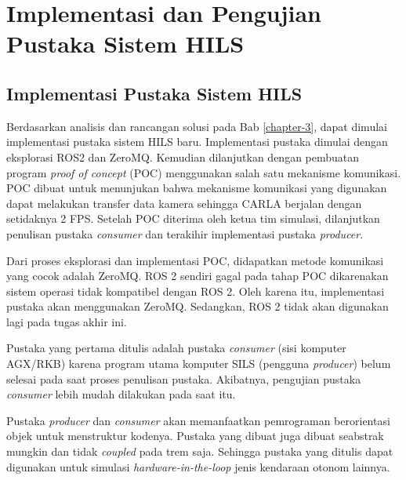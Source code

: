 \chapter{Implementasi dan Pengujian Pustaka Sistem HILS}\label{chapter-4}

\section{Implementasi Pustaka Sistem HILS}

Berdasarkan analisis dan rancangan solusi pada Bab \ref{chapter-3}, dapat
dimulai implementasi pustaka sistem HILS baru. Implementasi pustaka dimulai
dengan eksplorasi ROS2 dan ZeroMQ. Kemudian dilanjutkan dengan pembuatan program
\textit{proof of concept} (POC) menggunakan salah satu mekanisme komunikasi. POC
dibuat untuk menunjukan bahwa mekanisme komunikasi yang digunakan dapat
melakukan transfer data kamera sehingga CARLA berjalan dengan setidaknya 2 FPS.
Setelah POC diterima oleh ketua tim simulasi, dilanjutkan penulisan pustaka
\textit{consumer} dan terakihir implementasi pustaka \textit{producer}.

Dari proses eksplorasi dan implementasi POC, didapatkan metode komunikasi yang
cocok adalah ZeroMQ. ROS 2 sendiri gagal pada tahap POC dikarenakan sistem
operasi tidak kompatibel dengan ROS 2. Oleh karena itu, implementasi pustaka
akan menggunakan ZeroMQ. Sedangkan, ROS 2 tidak akan digunakan lagi pada tugas
akhir ini.

Pustaka yang pertama ditulis adalah pustaka \textit{consumer} (sisi
komputer AGX/RKB) karena program utama komputer SILS (pengguna
\textit{producer}) belum selesai pada saat proses penulisan pustaka. Akibatnya,
pengujian pustaka \textit{consumer} lebih mudah dilakukan pada saat itu.

Pustaka \textit{producer} dan \textit{consumer} akan memanfaatkan pemrograman
berorientasi objek untuk menstruktur kodenya. Pustaka yang dibuat juga dibuat
seabstrak mungkin dan tidak \textit{coupled} pada trem saja. Sehingga pustaka
yang ditulis dapat digunakan untuk simulasi \textit{hardware-in-the-loop} jenis
kendaraan otonom lainnya.

